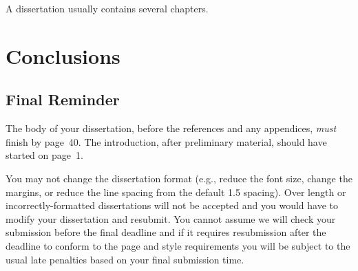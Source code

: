 \documentclass[msc,deptreport,dsti]{infthesis} %
\begin{document}
A dissertation usually contains several chapters.

\chapter{Conclusions}



\section{Final Reminder}

The body of your dissertation, before the references and any appendices,
\emph{must} finish by page~40. The introduction, after preliminary material,
should have started on page~1.

You may not change the dissertation format (e.g., reduce the font
size, change the margins, or reduce the line spacing from the default
1.5 spacing). Over length or incorrectly-formatted dissertations will
not be accepted and you would have to modify your dissertation and
resubmit.  You cannot assume we will check your submission before the
final deadline and if it requires resubmission after the deadline to
conform to the page and style requirements you will be subject to the
usual late penalties based on your final submission time.




% 
% 
% 
\end{document}
